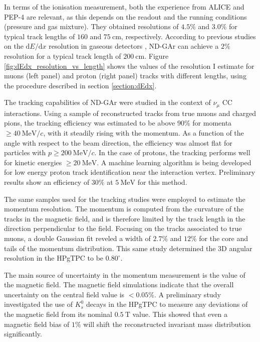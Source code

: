 In terms of the ionisation measurement, both the experience from ALICE and PEP-4 are relevant, as this depends on the readout and the running conditions (pressure and gas mixture). They obtained resolutions of $4.5\%$ and $3.0\%$ for typical track lengths of $160$ and $75~\mathrm{cm}$, respectively. According to previous studies on the $\mathrm{d}E/\mathrm{d}x$ resolution in gaseous detectors \cite{Lehraus1983}, ND-GAr can achieve a $2\%$ resolution for a typical track length of $200~\mathrm{cm}$. Figure \ref{fig:dEdx_resolution_vs_length} shows the values of the resolution I estimate for muons (left panel) and proton (right panel) tracks with different lengths, using the procedure described in section \ref{section:dEdx}.

The tracking capabilities of ND-GAr were studied in the context of $\nu_{\mu}$ CC interactions. Using a sample of reconstructed tracks from true muons and charged pions, the tracking efficiency was estimated to be above $90\%$ for momenta $\geq 40 ~ \mathrm{MeV}/c$, with it steadily rising with the momentum. As a function of the angle with respect to the beam direction, the efficiency was almost flat for particles with $p\geq 200 ~ \mathrm{MeV}/c$. In the case of protons, the tracking performs well for kinetic energies $\geq 20 ~ \mathrm{MeV}$. A machine learning algorithm is being developed for low energy proton track identification near the interaction vertex. Preliminary results show an efficiency of $30\%$ at $5 ~ \mathrm{MeV}$ for this method.

The same samples used for the tracking studies were employed to estimate the momentum resolution. The momentum is computed from the curvature of the tracks in the magnetic field, and is therefore limited by the track length in the direction perpendicular to the field. Focusing on the tracks associated to true muons, a double Gaussian fit reveled a width of $2.7\%$ and $12\%$ for the core and tails of the momentum distribution. This same study determined the 3D angular resolution in the HPgTPC to be $0.80^{\circ}$.

The main source of uncertainty in the momentum measurement is the value of the magnetic field. The magnetic field simulations indicate that the overall uncertainty on the central field value is $< 0.05 \%$. A preliminary study investigated the use of $K_{s}^{0}$ decays in the HPgTPC to measure any deviations of the magnetic field from its nominal $0.5 ~ \mathrm{T}$ value. This showed that even a magnetic field bias of $1\%$ will shift the reconstructed invariant mass distribution significantly.

